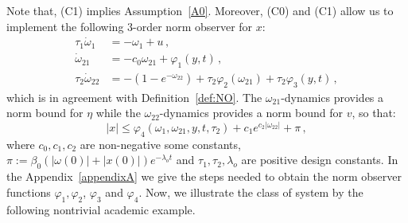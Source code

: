 \documentclass{rncauth}
\begin{document}
%
Note that, (C1) implies Assumption~\ref{A0}. Moreover, (C0) and
(C1) allow us to implement the following $3$-order norm observer
for $x$:
%
%
\begin{align}
\tau_1 \dot{\omega}_1 &=-\omega_1+u\,, \label{eq:NO0}\\
\dot{\omega}_{21} &= - c_0 \omega_{21} +\varphi_1(y,t)\,,\label{eq:NO1} \\
\tau_2 \dot{\omega}_{22}&= -(1-e^{-\omega_{22}}) + \tau_2
\varphi_2(\omega_{21})+\tau_2\varphi_3(y,t)\,,\label{eq:NO3}
\end{align}
%
which is in agreement with Definition~\ref{def:NO}.
%
%
The $\omega_{21}$-dynamics provides a norm bound for $\eta$ while
the $\omega_{22}$-dynamics provides a norm bound for $v$, so that:
%
\begin{equation}
|x| \leq \varphi_4(\omega_1,\omega_{21},y,t,\tau_2)+ c_1 e^{c_2
|\omega_{22}|}+ \pi\,,\label{eq:NObound}
\end{equation}
%
where $c_0,c_1,c_2$ are non-negative some constants,
$\pi:=\beta_0(|\omega(0)|+|x(0)|)e^{- \lambda_o t}$ and $\tau_1,
\tau_2,\lambda_o$ are positive design constants. In the
Appendix~\ref{appendixA} we give the steps needed to obtain the
norm observer functions $\varphi_1,\varphi_2$, $\varphi_3$ and
$\varphi_4$.
%
Now, we illustrate the class of system by the following nontrivial
academic example.
%
\end{document}
